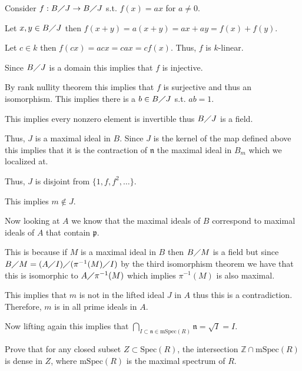 \documentclass[12pt, letterpaper]{article}
\newcommand{\Z}{\mathbb{Z}}
\newcommand{\p}{\mathfrak{p}}
\newcommand{\Spec}{\mathrm{Spec}}
\newcommand{\mf}[1]{\mathfrak{#1}}
\begin{document}
\begin{problemproof}
    Consider $f : B \diagup J \to B \diagup J$ s.t. $f(x)=ax$ for $a \neq 0$.

    Let $x,y \in B \diagup J$ then $f(x+y)=a(x+y)=ax+ay=f(x)+f(y)$.

    Let $c \in k$ then $f(cx)=acx=cax=cf(x)$. Thus, $f$ is $k$-linear.

    Since $B \diagup J$ is a domain this implies that $f$ is injective.

    By rank nullity theorem this implies that $f$ is surjective and thus an isomorphism. This implies there is a $b \in B \diagup J$ s.t. $ab=1$.

    This implies every nonzero element is invertible thus $B \diagup J$ is a field.

    Thus, $J$ is a maximal ideal in $B$. Since $J$ is the kernel of the map defined above this implies that it is the contraction of $\mf{n}$ the maximal ideal in $B_m$ which we localized at.
    
    Thus, $J$ is disjoint from $\{1,f,f^2,\dots\}$.

    This implies $m \notin J$.

    Now looking at $A$ we know that the maximal ideals of $B$ correspond to maximal ideals of $A$ that contain $\p$.

    This is because if $M$ is a maximal ideal in $B$ then $B \diagup M$ is a field but since $B \diagup M = (A \diagup I) \diagup (\pi^{-1}(M) \diagup I)$ by the third isomorphism theorem we have that this is isomorphic to $A \diagup \pi^{-1}(M)$ which implies $\pi^{-1}(M)$ is also maximal.

    This implies that $m$ is not in the lifted ideal $J$ in $A$ thus this is a contradiction. Therefore, $m$ is in all prime ideals in $A$.

    Now lifting again this implies that $\bigcap_{I \subset \mf{n} \in \mathrm{mSpec}(R)} \mf{n} = \sqrt{I}=I$.
\end{problemproof}
\begin{subproblem}{}
    Prove that for any closed subset $Z \subset \Spec(R)$, the intersection $\Z \cap \mathrm{mSpec}(R)$ is dense
in $Z$, where $\mathrm{mSpec}(R)$ is the maximal spectrum of $R$.
\end{subproblem}
\end{document}
